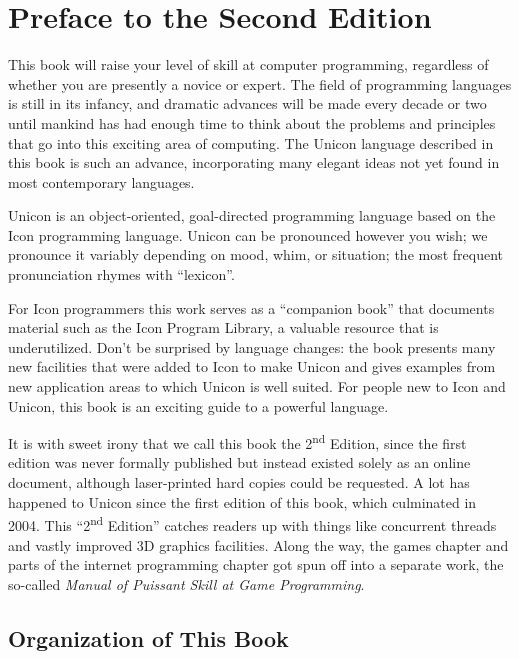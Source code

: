 \chapter{Preface to the Second Edition}

This book will raise your level of skill at computer programming,
regardless of whether you are presently a novice or expert. The field
of programming languages is still in its infancy, and dramatic advances
will be made every decade or two until mankind has had enough time to
think about the problems and principles that go into this exciting area
of computing. The Unicon language described in this book is such an
advance, incorporating many elegant ideas not yet found in most
contemporary languages.

Unicon is an object-oriented, goal-directed programming language based
on the Icon programming language. Unicon can be pronounced however you
wish; we pronounce it variably depending on mood, whim, or situation;
the most frequent pronunciation rhymes with ``lexicon''.

For Icon programmers this work serves as a ``companion book'' that documents
material such as the Icon Program Library, a valuable resource that is
underutilized.  Don't be surprised by language changes: the book presents many
new facilities that were added to Icon to make Unicon and gives examples from
new application areas to which Unicon is well suited. For people new to Icon
and Unicon, this book is an exciting guide to a powerful language.

It is with sweet irony that we call this book the 2\textsuperscript{nd}
Edition, since the first edition was never formally published but
instead existed solely as an online document, although laser-printed
hard copies could be requested. A lot has happened to Unicon since the
first edition of this book, which culminated in 2004. This
{\textquotedblleft}2\textsuperscript{nd} Edition{\textquotedblright}
catches readers up with things like concurrent threads and vastly
improved 3D graphics facilities. Along the way, the games chapter and
parts of the internet programming chapter got spun off into a separate
work, the so-called \textit{Manual of Puissant Skill at Game
Programming}. 

\section*{Organization of This Book}

